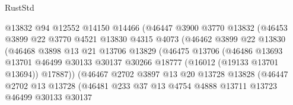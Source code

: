\begin{lexlean}{RustStd}
\begin{coremodule}
                            @13832
                            @94
                            @12552
                            @14150
                            @14466
                            (@46447
                              @3900
                              @3770
                              @13832
                              (@46453
                                @3899
                                @22
                                @3770
                                @4521
                                @13830
                                @4315
                                @4073
                                (@46462
                                  @3899
                                  @22
                                  @13830
                                  (@46468
                                    @3898
                                    @13
                                    @21
                                    @13706
                                    @13829
                                    (@46475
                                      @13706
                                      (@46486
                                        @13693
                                        @13701
                                        @46499
                                        @30133
                                        @30137
                                        @30266
                                        @18777
                                        (@16012 (@19133 @13701 @13694))
                                        @17887))
                                    (@46467
                                      @2702
                                      @3897
                                      @13
                                      @20
                                      @13728
                                      @13828
                                      (@46447
                                        @2702
                                        @13
                                        @13728
                                        (@46481
                                          @233
                                          @37
                                          @13
                                          @4754
                                          @4888
                                          @13711
                                          @13723
                                          @46499
                                          @30133
                                          @30137

\end{coremodule}
\end{lexlean}
